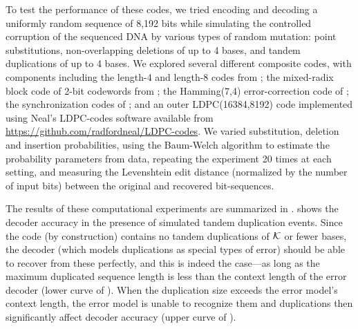 \documentclass[english]{article}
\begin{document}
To test the performance of these codes, we tried encoding and decoding a uniformly random sequence of 8,192 bits
while simulating the controlled corruption of the sequenced DNA by various types of random mutation:
point substitutions, non-overlapping deletions of up to 4 bases, and tandem duplications of up to 4 bases.
We explored several different composite codes, with components including
the length-4 and length-8 codes from ;
the mixed-radix block code of 2-bit codewords from ;
the Hamming(7,4) error-correction code of ;
the synchronization codes of ;
and an outer LDPC(16384,8192) code implemented using Neal's LDPC-codes
software available from \url{https://github.com/radfordneal/LDPC-codes}.
We varied substitution, deletion and insertion probabilities,
using the Baum-Welch algorithm to estimate the probability parameters from data,
repeating the experiment 20 times at each setting,
and measuring the Levenshtein edit distance (normalized by the number of input bits) between the original and recovered bit-sequences.

The results of these computational experiments are summarized in .
 shows the decoder accuracy in the presence of simulated tandem duplication events.
Since the code (by construction) contains no tandem duplications of ${\cal K}$ or fewer bases,
the decoder (which models duplications as special types of error)
should be able to recover from these perfectly, and this is indeed the case---as long
as the maximum duplicated sequence length is less than the context length of the error decoder
(lower curve of ).
When the duplication size exceeds the error model's context length,
the error model is unable to recognize them and duplications then significantly affect decoder accuracy
(upper curve of ).
\end{document}
